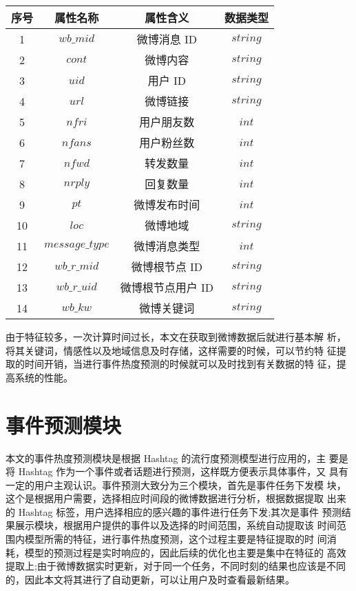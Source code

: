 \begin{table}[H]
    \centering
    \footnotesize%
      \label{tab:t51}
    \setlength{\tabcolsep}{30pt}%
    \renewcommand{\arraystretch}{1.2}%
    \begin{tabular}{cccc}
        \hline
         \textbf{序号} & \textbf{属性名称 }& \textbf{属性含义} &\textbf{ 数据类型}   \\
        \hline
         1 & $wb\_mid$ & 微博消息 ID & $string$ \\
         2 & $cont$ & 微博内容& $string$ \\
         3 & $uid$ & 用户 ID & $string$\\
         4 & $url$ & 微博链接 & $string$ \\
         5 & $nfri$ & 用户朋友数  &$int$ \\
         6 & $nfans$ & 用户粉丝数 & $int$ \\
         7 & $nfwd$ & 转发数量 & $int$ \\
         8 & $nrply$ & 回复数量 & $int$ \\
         9 & $pt$ & 微博发布时间 & $int$ \\
         10 & $loc$ & 微博地域 & $string$ \\
         11 & $message\_type$ & 微博消息类型& $int$ \\
         12 & $wb\_r\_mid$ & 微博根节点 ID & $string$ \\
         13 & $wb\_r\_uid$ & 微博根节点用户 ID & $string$ \\
         14 & $wb\_kw$ & 微博关键词 & $string$ \\
        \hline
    \end{tabular}
 
\end{table}
由于特征较多，一次计算时间过长，本文在获取到微博数据后就进行基本解 析，将其关键词，情感性以及地域信息及时存储，这样需要的时候，可以节约特 征提取的时间开销，当进行事件热度预测的时候就可以及时找到有关数据的特 征，提高系统的性能。



\section{事件预测模块}
本文的事件热度预测模块是根据 Hashtag 的流行度预测模型进行应用的，主 要是将 Hashtag 作为一个事件或者话题进行预测，这样既方便表示具体事件，又 具有一定的用户主观认识。事件预测大致分为三个模块，首先是事件任务下发模 块，这个是根据用户需要，选择相应时间段的微博数据进行分析，根据数据提取 出来的 Hashtag 标签，用户选择相应的感兴趣的事件进行任务下发;其次是事件 预测结果展示模块，根据用户提供的事件以及选择的时间范围，系统自动提取该 时间范围内模型所需的特征，进行事件热度预测，这个过程主要是特征提取的时 间消耗，模型的预测过程是实时响应的，因此后续的优化也主要是集中在特征的 高效提取上;由于微博数据实时更新，对于同一个任务，不同时刻的结果也应该是不同的，因此本文将其进行了自动更新，可以让用户及时查看最新结果。

